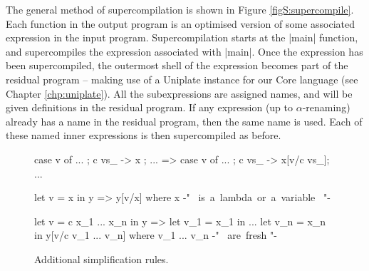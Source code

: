 
The general method of supercompilation is shown in Figure \ref{figS:supercompile}. Each function in the output program is an optimised version of some associated expression in the input program. Supercompilation starts at the |main| function, and supercompiles the expression associated with |main|. Once the expression has been supercompiled, the outermost shell of the expression becomes part of the residual program -- making use of a Uniplate instance for our Core language (see Chapter \ref{chp:uniplate}). All the subexpressions are assigned names, and will be given definitions in the residual program. If any expression (up to $\alpha$-renaming) already has a name in the residual program, then the same name is used. Each of these named inner expressions is then supercompiled as before.

\begin{figure}
\ignore\begin{code}
case v of {... ; c vs_ -> x ; ...}
    => case v of {... ; c vs_ -> x[v/c vs_]; ...}

let v = x in y
    => y[v/x]
    where x {-" \hbox{ is a lambda or a variable } "-}

let v = c x_1 ... x_n in y
    =>  let v_1 = x_1 in
        ...
        let v_n = x_n in
        y[v/c v_1 ... v_n]
    where v_1 ... v_n {-" \hbox{ are fresh} "-}
\end{code}
\caption{Additional simplification rules.}
\label{figS:simplify}
\end{figure}

